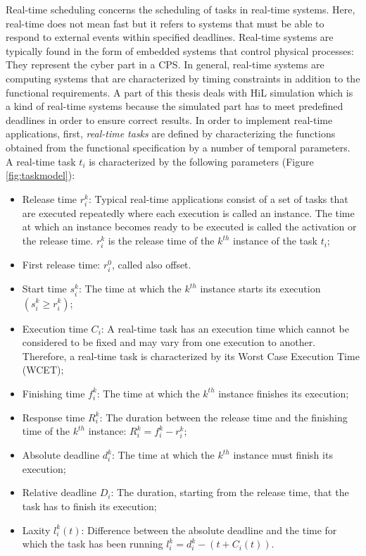 Real-time scheduling concerns the scheduling of tasks in real-time systems. Here, real-time does not mean fast but it refers to systems that must be able to respond to external events within specified deadlines. Real-time systems are typically found in the form of embedded systems that control physical processes: They represent the cyber part in a CPS. In general, real-time systems are computing systems that are characterized by timing constraints in addition to the functional requirements. A part of this thesis deals with HiL simulation which is a kind of real-time systems because the simulated part has to meet predefined deadlines in order to ensure correct results.
In order to implement real-time applications, first, \textit{real-time tasks} are defined by characterizing the functions obtained from the functional specification by a number of temporal parameters. A real-time task $t_i$ is characterized by the following parameters (Figure \ref{fig:taskmodel}):
\begin{itemize}
\item Release time $r^k_i$: Typical real-time applications consist of a set of tasks that are executed repeatedly where each execution is called an instance. The time at which an instance becomes ready to be executed is called the activation or the release time. $r^k_i$ is the release time of the $k^{th}$ instance of the task $t_i$;
\item First release time: $r^0_i$, called also offset.
\item Start time $s^k_i$: The time at which the $k^{th}$ instance starts its execution $(s^k_i \geq r^k_i)$;
\item Execution time $C_i$: A real-time task has an execution time which cannot be considered to be fixed and may vary from one execution to another. Therefore, a real-time task is characterized by its Worst Case Execution Time (WCET);
\item Finishing time $f^k_i$: The time at which the $k^{th}$ instance finishes its execution;
\item Response time $R^k_i$: The duration between the release time and the finishing time of the $k^{th}$ instance: $R^k_i = f^k_i - r^k_i$;
\item Absolute deadline $d^k_i$: The time at which the $k^{th}$ instance must finish its execution;
\item Relative deadline $D_i$: The duration, starting from the release time, that the task has to finish its execution;
\item Laxity $l^k_i(t)$: Difference between the absolute deadline and the time for which the task has been running $l^k_i=d^k_i-(t+C_i(t))$.
\end{itemize}

